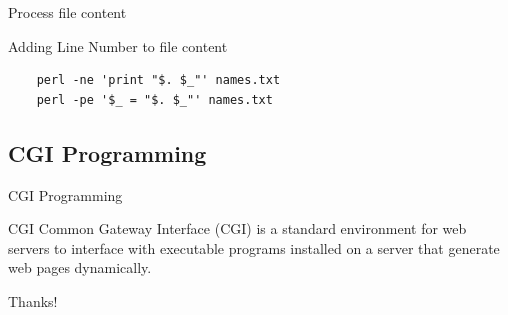 \documentclass[UTF8]{beamer}
\begin{document}
\begin{frame}[fragile]{Process file content}
\begin{block}{Adding Line Number to file content}
  \begin{verbatim}
    perl -ne 'print "$. $_"' names.txt
    perl -pe '$_ = "$. $_"' names.txt
  \end{verbatim}
\end{block}
\end{frame}

\subsection{CGI Programming}
\begin{frame}[t]{CGI Programming}
    \begin{block}{CGI}
        Common Gateway Interface (CGI) is a standard environment for web servers to interface with executable programs installed on a server that generate web pages dynamically.
    \end{block}

\end{frame}


\begin{frame}
  \centerline{\Huge{Thanks!}}
\end{frame}
\end{document}
